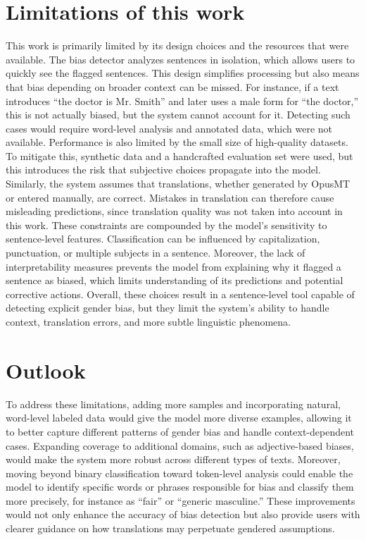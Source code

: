 \section{Limitations of this work}
   This work is primarily limited by its design choices and the resources that were available. The bias detector analyzes sentences in isolation, which allows users to quickly see the flagged sentences. This design simplifies processing but also means that bias depending on broader context can be missed. For instance, if a text introduces “the doctor is Mr. Smith” and later uses a male form for “the doctor,” this is not actually biased, but the system cannot account for it. Detecting such cases would require word-level analysis and annotated data, which were not available. Performance is also limited by the small size of high-quality datasets. To mitigate this, synthetic data and a handcrafted evaluation set were used, but this introduces the risk that subjective choices propagate into the model. Similarly, the system assumes that translations, whether generated by OpusMT or entered manually, are correct. Mistakes in translation can therefore cause misleading predictions, since translation quality was not taken into account in this work. These constraints are compounded by the model’s sensitivity to sentence-level features. Classification can be influenced by capitalization, punctuation, or multiple subjects in a sentence. Moreover, the lack of interpretability measures prevents the model from explaining why it flagged a sentence as biased, which limits understanding of its predictions and potential corrective actions. Overall, these choices result in a sentence-level tool capable of detecting explicit gender bias, but they limit the system’s ability to handle context, translation errors, and more subtle linguistic phenomena.

\section{Outlook}
   To address these limitations, adding more samples and incorporating natural, word-level labeled data would give the model more diverse examples, allowing it to better capture different patterns of gender bias and handle context-dependent cases. Expanding coverage to additional domains, such as adjective-based biases, would make the system more robust across different types of texts. Moreover, moving beyond binary classification toward token-level analysis could enable the model to identify specific words or phrases responsible for bias and classify them more precisely, for instance as “fair” or “generic masculine.” These improvements would not only enhance the accuracy of bias detection but also provide users with clearer guidance on how translations may perpetuate gendered assumptions.

